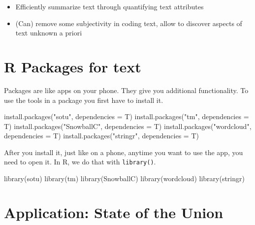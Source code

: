 \documentclass[
  letterpaper,
  DIV=11,
  numbers=noendperiod]{scrreprt}
\newenvironment{Shaded}{\begin{snugshade}}{\end{snugshade}}
\newcommand{\AttributeTok}[1]{\textcolor[rgb]{0.40,0.45,0.13}{#1}}
\newcommand{\FunctionTok}[1]{\textcolor[rgb]{0.28,0.35,0.67}{#1}}
\newcommand{\NormalTok}[1]{\textcolor[rgb]{0.00,0.23,0.31}{#1}}
\newcommand{\StringTok}[1]{\textcolor[rgb]{0.13,0.47,0.30}{#1}}
\providecommand{\tightlist}{%
  \setlength{\itemsep}{0pt}\setlength{\parskip}{0pt}}\usepackage{longtable,booktabs,array}
\begin{document}
\begin{itemize}
\tightlist
\item
  Efficiently summarize text through quantifying text attributes
\item
  (Can) remove some subjectivity in coding text, allow to discover
  aspects of text unknown a priori
\end{itemize}

\hypertarget{r-packages-for-text}{%
\section{R Packages for text}\label{r-packages-for-text}}

Packages are like apps on your phone. They give you additional
functionality. To use the tools in a package you first have to install
it.

\begin{Shaded}
\begin{Highlighting}[]
\FunctionTok{install.packages}\NormalTok{(}\StringTok{"sotu"}\NormalTok{, }\AttributeTok{dependencies =}\NormalTok{ T)}
\FunctionTok{install.packages}\NormalTok{(}\StringTok{"tm"}\NormalTok{, }\AttributeTok{dependencies =}\NormalTok{ T)}
\FunctionTok{install.packages}\NormalTok{(}\StringTok{"SnowballC"}\NormalTok{, }\AttributeTok{dependencies =}\NormalTok{ T)}
\FunctionTok{install.packages}\NormalTok{(}\StringTok{"wordcloud"}\NormalTok{, }\AttributeTok{dependencies =}\NormalTok{ T)}
\FunctionTok{install.packages}\NormalTok{(}\StringTok{"stringr"}\NormalTok{, }\AttributeTok{dependencies =}\NormalTok{ T)}
\end{Highlighting}
\end{Shaded}

After you install it, just like on a phone, anytime you want to use the
app, you need to open it. In R, we do that with \texttt{library()}.

\begin{Shaded}
\begin{Highlighting}[]
\FunctionTok{library}\NormalTok{(sotu)}
\FunctionTok{library}\NormalTok{(tm)}
\FunctionTok{library}\NormalTok{(SnowballC)}
\FunctionTok{library}\NormalTok{(wordcloud)}
\FunctionTok{library}\NormalTok{(stringr)}
\end{Highlighting}
\end{Shaded}

\hypertarget{application-state-of-the-union}{%
\section{Application: State of the
Union}\label{application-state-of-the-union}}
\end{document}
